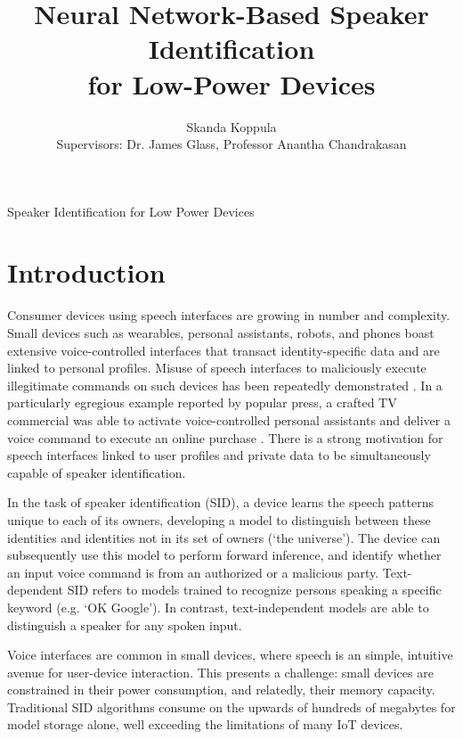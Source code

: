 \documentclass[journal,12pt,onecolumn,draftclsnofoot,]{sty/IEEEtran}
\begin{document}
\title{Neural Network-Based Speaker Identification \\ for Low-Power Devices}

\author{Skanda Koppula \\
        Supervisors: Dr. James Glass, Professor Anantha Chandrakasan}%

%
{Speaker Identification for Low Power Devices}

\maketitle

\section{Introduction}
Consumer devices using speech interfaces are growing in number and complexity. Small devices such as wearables, personal assistants, robots, and phones boast extensive voice-controlled interfaces that transact identity-specific data and are linked to personal profiles. Misuse of speech interfaces to maliciously execute illegitimate commands on such devices has been repeatedly demonstrated \cite{price_2016, feldman_2016}. In a particularly egregious example reported by popular press, a crafted TV commercial was able to activate voice-controlled personal assistants and deliver a voice command to execute an online purchase \cite{bbc_news_2017}. There is a strong motivation for speech interfaces linked to user profiles and private data to be simultaneously capable of speaker identification.

In the task of speaker identification (SID), a device learns the speech patterns unique to each of its owners, developing a model to distinguish between these identities and identities not in its set of owners (`the universe’). The device can subsequently use this model to perform forward inference, and identify whether an input voice command is from an authorized or a malicious party. Text-dependent SID refers to models trained to recognize persons speaking a specific keyword (e.g. `OK Google’). In contrast, text-independent models are able to distinguish a speaker for any spoken input.

Voice interfaces are common in small devices, where speech is an simple, intuitive avenue for user-device interaction. This presents a challenge: small devices are constrained in their power consumption, and relatedly, their memory capacity. Traditional SID algorithms consume on the upwards of hundreds of megabytes for model storage alone, well exceeding the limitations of many IoT devices.
\end{document}
